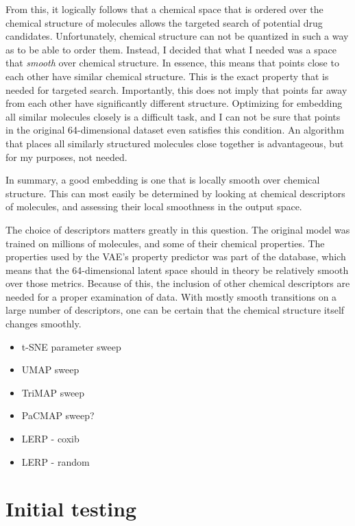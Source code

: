 From this, it logically follows that a chemical space that is ordered over the chemical structure of molecules allows the targeted search of potential drug candidates. Unfortunately, chemical structure can not be quantized in such a way as to be able to order them. Instead, I decided that what I needed was a space that \textit{smooth} over chemical structure. In essence, this means that points close to each other have similar chemical structure. This is the exact property that is needed for targeted search. Importantly, this does not imply that points far away from each other have significantly different structure. Optimizing for embedding all similar molecules closely is a difficult task, and I can not be sure that points in the original 64-dimensional dataset even satisfies this condition. An algorithm that places all similarly structured molecules close together is advantageous, but for my purposes, not needed.

In summary, a good embedding is one that is locally smooth over chemical structure. This can most easily be determined by looking at chemical descriptors of molecules, and assessing their local smoothness in the output space.

The choice of descriptors matters greatly in this question. The original model was trained on millions of molecules, and some of their chemical properties. The properties used by the VAE's property predictor was part of the database, which means that the 64-dimensional latent space should in theory be relatively smooth over those metrics. Because of this, the inclusion of other chemical descriptors are needed for a proper examination of data. With mostly smooth transitions on a large number of descriptors, one can be certain that the chemical structure itself changes smoothly.


\begin{itemize}
	\item t-SNE parameter sweep
	\item UMAP sweep
	\item TriMAP sweep
	\item PaCMAP sweep?
	\item LERP - coxib
	\item LERP - random
\end{itemize}

\section{Initial testing}\label{sec:initial-testing}

